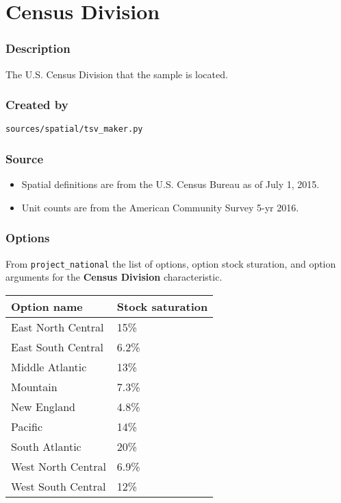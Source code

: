 \section{Census Division}\label{census_division}

\subsubsection{Description}\label{description-11}

The U.S. Census Division that the sample is located.

\subsubsection{Created by}\label{created-by-11}

\texttt{sources/spatial/tsv\_maker.py}

\subsubsection{Source}\label{source-11}

\begin{itemize}
 
\item
  Spatial definitions are from the U.S. Census Bureau as of July 1,
  2015.
\item
  Unit counts are from the American Community Survey 5-yr 2016.
\end{itemize}

\subsubsection{Options}\label{options-11}

From \texttt{project\_national} the list of options, option stock
sturation, and option arguments for the \textbf{Census Division}
characteristic.

\begin{longtable}[]{@{}ll@{}}
\toprule\noalign{}
Option name & Stock saturation \\
\midrule\noalign{}
\endhead
\bottomrule\noalign{}
\endlastfoot
East North Central & 15\% \\
East South Central & 6.2\% \\
Middle Atlantic & 13\% \\
Mountain & 7.3\% \\
New England & 4.8\% \\
Pacific & 14\% \\
South Atlantic & 20\% \\
West North Central & 6.9\% \\
West South Central & 12\% \\
\end{longtable}

